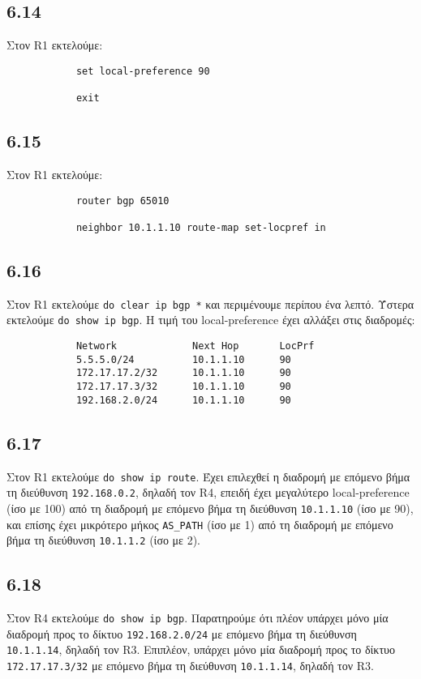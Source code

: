 \documentclass[a4paper, 12pt]{article}
\begin{document}
	\subsection*{6.14}
		Στον R1 εκτελούμε:
		
		\begin{verbatim}
			set local-preference 90
			
			exit
		\end{verbatim}

	\subsection*{6.15}
		Στον R1 εκτελούμε:
		
		\begin{verbatim}
			router bgp 65010
			
			neighbor 10.1.1.10 route-map set-locpref in 
		\end{verbatim}

	\subsection*{6.16}
		Στον R1 εκτελούμε \verb|do clear ip bgp *| και περιμένουμε περίπου ένα λεπτό. Ύστερα εκτελούμε \verb|do show ip bgp|. Η τιμή του local-preference έχει αλλάξει στις διαδρομές:
		
		\begin{verbatim}
			Network             Next Hop       LocPrf
			5.5.5.0/24          10.1.1.10      90
			172.17.17.2/32      10.1.1.10      90
			172.17.17.3/32      10.1.1.10      90
			192.168.2.0/24      10.1.1.10      90
		\end{verbatim}

	\subsection*{6.17}
		Στον R1 εκτελούμε \verb|do show ip route|. Έχει επιλεχθεί η διαδρομή με επόμενο βήμα τη διεύθυνση \verb|192.168.0.2|, δηλαδή τον R4, επειδή έχει μεγαλύτερο local-preference (ίσο με 100) από τη διαδρομή με επόμενο βήμα τη διεύθυνση \verb|10.1.1.10| (ίσο με 90), και επίσης έχει μικρότερο μήκος \verb|AS_PATH| (ίσο με 1) από τη διαδρομή με επόμενο βήμα τη διεύθυνση \verb|10.1.1.2| (ίσο με 2).

	\subsection*{6.18}
		Στον R4 εκτελούμε \verb|do show ip bgp|. Παρατηρούμε ότι πλέον υπάρχει μόνο μία διαδρομή προς το δίκτυο \verb|192.168.2.0/24| με επόμενο βήμα τη διεύθυνση \verb|10.1.1.14|, δηλαδή τον R3. Επιπλέον, υπάρχει μόνο μία διαδρομή προς το δίκτυο \verb|172.17.17.3/32| με επόμενο βήμα τη διεύθυνση \verb|10.1.1.14|, δηλαδή τον R3.
\end{document}
